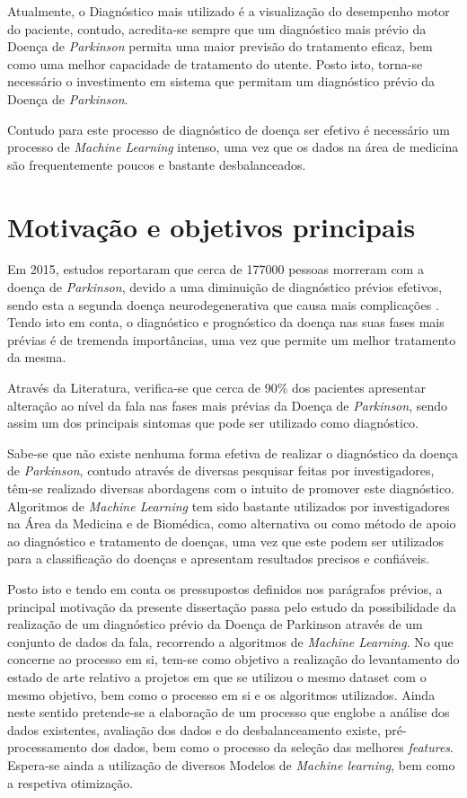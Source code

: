 \documentclass[12pt,a4paper,twoside]{report}
\begin{document}
{Atualmente, o Diagnóstico mais utilizado é a visualização do desempenho motor do paciente, contudo, acredita-se sempre que um diagnóstico mais prévio da Doença de \textit{Parkinson} permita uma maior previsão do tratamento eficaz, bem como uma melhor capacidade de tratamento do utente. Posto isto, torna-se necessário o investimento em sistema que permitam um diagnóstico prévio da Doença de \textit{Parkinson}.

Contudo para este processo de diagnóstico de doença ser efetivo é necessário um processo de \textit{Machine Learning} intenso, uma vez que os dados na área de medicina são frequentemente poucos e bastante desbalanceados.


\section{Motivação e objetivos principais}

Em 2015, estudos reportaram que cerca de 177000 pessoas morreram com a doença de \textit{Parkinson}, devido a uma diminuição de diagnóstico prévios efetivos, sendo esta a segunda doença neurodegenerativa que causa mais complicações \cite{20161545}. Tendo isto em conta, o diagnóstico e prognóstico da doença nas suas fases mais prévias é de tremenda importâncias, uma vez que permite um melhor tratamento da mesma.

Através da Literatura, verifica-se que cerca de 90\% dos pacientes apresentar alteração ao nível da fala nas fases mais prévias da Doença de \textit{Parkinson}, sendo assim um dos principais sintomas que pode ser utilizado como diagnóstico.

Sabe-se que não existe nenhuma forma efetiva de realizar o diagnóstico da doença de \textit{Parkinson}, contudo através de diversas pesquisar feitas por investigadores, têm-se realizado diversas abordagens com o intuito de promover este diagnóstico.  Algoritmos de \textit{Machine Learning} tem sido bastante utilizados por investigadores na Área da Medicina e de Biomédica, como alternativa ou como método de apoio ao diagnóstico e tratamento de doenças, uma vez que este podem ser utilizados para a classificação do doenças e apresentam resultados precisos e confiáveis.

Posto isto e tendo em conta os pressupostos definidos nos parágrafos prévios, a principal motivação da presente dissertação passa pelo estudo da possibilidade da realização de um diagnóstico prévio da Doença de Parkinson através de um conjunto de dados da fala, recorrendo a algoritmos de \textit{Machine Learning}. No que concerne ao processo em si, tem-se como objetivo a realização do levantamento do estado de arte relativo a projetos em que se utilizou o mesmo dataset com o mesmo objetivo, bem como o processo em si e os algoritmos utilizados. Ainda neste sentido pretende-se a elaboração de um processo que englobe a análise dos dados existentes, avaliação dos dados e do desbalanceamento existe, pré-processamento dos dados, bem como o processo da seleção das melhores \textit{features}. Espera-se ainda a utilização de diversos Modelos de \textit{Machine learning}, bem como a respetiva otimização.


}
\end{document}
